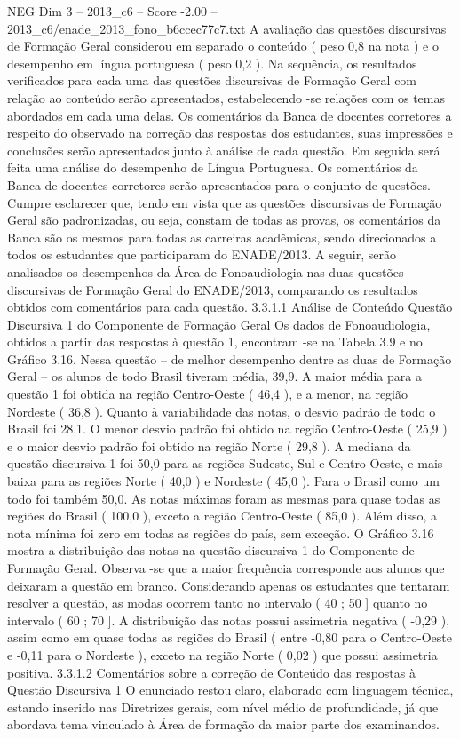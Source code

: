 \begin{textsample}{NEG Dim 3 – 2013\_c6 – Score -2.00 – 2013\_c6/enade\_2013\_fono\_b6ccec77c7.txt}
A avaliação das questões discursivas de Formação Geral considerou em separado o conteúdo ( peso 0,8 na nota ) e o desempenho em língua portuguesa ( peso 0,2 ).
Na sequência, os resultados verificados para cada uma das questões discursivas de Formação Geral com relação ao conteúdo serão apresentados, estabelecendo -se relações com os temas abordados em cada uma delas.
Os comentários da Banca de docentes corretores a respeito do observado na correção das respostas dos estudantes, suas impressões e conclusões serão apresentados junto à análise de cada questão.
Em seguida será feita uma análise do desempenho de Língua Portuguesa.
Os comentários da Banca de docentes corretores serão apresentados para o conjunto de questões.
Cumpre esclarecer que, tendo em vista que as questões discursivas de Formação Geral são padronizadas, ou seja, constam de todas as provas, os comentários da Banca são os mesmos para todas as carreiras acadêmicas, sendo direcionados a todos os estudantes que participaram do ENADE/2013.
A seguir, serão analisados os desempenhos da Área de Fonoaudiologia nas duas questões discursivas de Formação Geral do ENADE/2013, comparando os resultados obtidos com comentários para cada questão. 3.3.1.1 Análise de Conteúdo Questão Discursiva 1 do Componente de Formação Geral Os dados de Fonoaudiologia, obtidos a partir das respostas à questão 1, encontram -se na Tabela 3.9 e no Gráfico 3.16.
Nessa questão – de melhor desempenho dentre as duas de Formação Geral – os alunos de todo Brasil tiveram média, 39,9.
A maior média para a questão 1 foi obtida na região Centro-Oeste ( 46,4 ), e a menor, na região Nordeste ( 36,8 ).
Quanto à variabilidade das notas, o desvio padrão de todo o Brasil foi 28,1.
O menor desvio padrão foi obtido na região Centro-Oeste ( 25,9 ) e o maior desvio padrão foi obtido na região Norte ( 29,8 ).
A mediana da questão discursiva 1 foi 50,0 para as regiões Sudeste, Sul e Centro-Oeste, e mais baixa para as regiões Norte ( 40,0 ) e Nordeste ( 45,0 ).
Para o Brasil como um todo foi também 50,0.
As notas máximas foram as mesmas para quase todas as regiões do Brasil ( 100,0 ), exceto a região Centro-Oeste ( 85,0 ).
Além disso, a nota mínima foi zero em todas as regiões do país, sem exceção.
O Gráfico 3.16 mostra a distribuição das notas na questão discursiva 1 do Componente de Formação Geral.
Observa -se que a maior frequência corresponde aos alunos que deixaram a questão em branco.
Considerando apenas os estudantes que tentaram resolver a questão, as modas ocorrem tanto no intervalo ( 40 ; 50 ] quanto no intervalo ( 60 ; 70 ].
A distribuição das notas possui assimetria negativa ( -0,29 ), assim como em quase todas as regiões do Brasil ( entre -0,80 para o Centro-Oeste e -0,11 para o Nordeste ), exceto na região Norte ( 0,02 ) que possui assimetria positiva. 3.3.1.2 Comentários sobre a correção de Conteúdo das respostas à Questão Discursiva 1 O enunciado restou claro, elaborado com linguagem técnica, estando inserido nas Diretrizes gerais, com nível médio de profundidade, já que abordava tema vinculado à Área de formação da maior parte dos examinandos.

\end{textsample}
